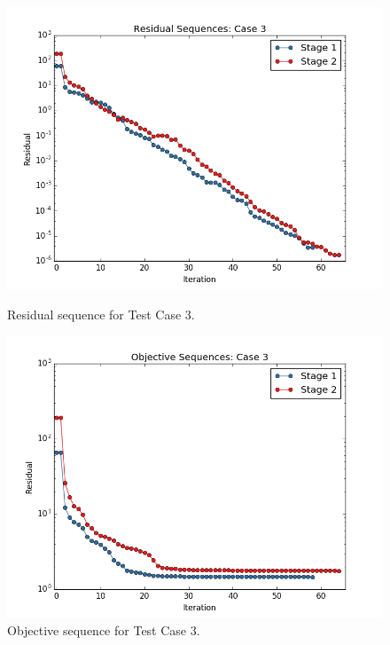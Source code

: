 \documentclass[]{aiaa-tc}%
\begin{document}
\begin{figure}[!ht]
\centering
\begin{minipage}{.50\textwidth}
 \centering
 \includegraphics[width=.8\textwidth]{../images/residual_case3}
 \caption{Residual sequence for Test Case 3.}
 \label{fig:residual_case3}
\end{minipage}%
\begin{minipage}{.50\textwidth}
 \centering
 \includegraphics[width=.8\textwidth]{../images/objective_case3}
 \caption{Objective sequence for Test Case 3.}
 \label{fig:objective_case3}
\end{minipage}
\end{figure}
\end{document}
